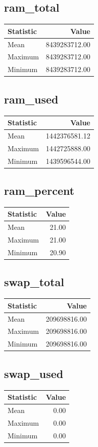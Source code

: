 \documentclass[11pt]{article}
\begin{document}
\subsection{ram_total}
\begin{tabular}{lr}
\toprule
Statistic & Value \\
\midrule
Mean & 8439283712.00 \\
Maximum & 8439283712.00 \\
Minimum & 8439283712.00 \\
\bottomrule
\end{tabular}


\subsection{ram_used}
\begin{tabular}{lr}
\toprule
Statistic & Value \\
\midrule
Mean & 1442376581.12 \\
Maximum & 1442725888.00 \\
Minimum & 1439596544.00 \\
\bottomrule
\end{tabular}


\subsection{ram_percent}
\begin{tabular}{lr}
\toprule
Statistic & Value \\
\midrule
Mean & 21.00 \\
Maximum & 21.00 \\
Minimum & 20.90 \\
\bottomrule
\end{tabular}


\subsection{swap_total}
\begin{tabular}{lr}
\toprule
Statistic & Value \\
\midrule
Mean & 209698816.00 \\
Maximum & 209698816.00 \\
Minimum & 209698816.00 \\
\bottomrule
\end{tabular}


\subsection{swap_used}
\begin{tabular}{lr}
\toprule
Statistic & Value \\
\midrule
Mean & 0.00 \\
Maximum & 0.00 \\
Minimum & 0.00 \\
\bottomrule
\end{tabular}
\end{document}
